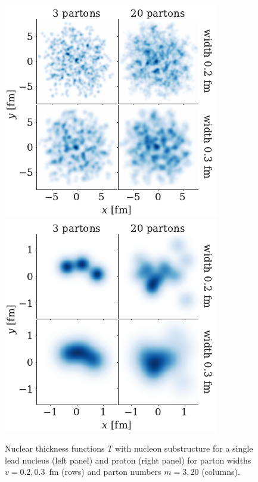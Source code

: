 \documentclass[3p,times,procedia]{elsarticle}
\begin{document}
\begin{figure}
  \centering
  \includegraphics{Pb_thickness} 
  \hspace{8ex}
  \includegraphics{p_thickness}
  \caption{\label{fig:substructure}
    Nuclear thickness functions $T$ with nucleon substructure for a single lead nucleus (left panel) and proton (right panel) for parton widths $v= 0.2, 0.3$~fm (rows) and parton numbers $m=3,20$ (columns).
  }
\end{figure}
\end{document}
